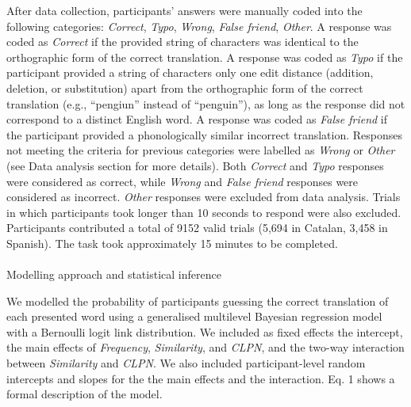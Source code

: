 \documentclass[
]{article}
\makeatletter
\let\oldparagraph\paragraph
\renewcommand{\paragraph}{
    \@ifstar
      \xxxParagraphStar
      \xxxParagraphNoStar
  }
\newcommand{\xxxParagraphStar}[1]{\oldparagraph*{#1}\mbox{}}
\newcommand{\xxxParagraphNoStar}[1]{\oldparagraph{#1}\mbox{}}
\makeatother
\begin{document}
After data collection, participants' answers were manually coded into
the following categories: \emph{Correct}, \emph{Typo}, \emph{Wrong},
\emph{False friend}, \emph{Other}. A response was coded as
\emph{Correct} if the provided string of characters was identical to the
orthographic form of the correct translation. A response was coded as
\emph{Typo} if the participant provided a string of characters only one
edit distance (addition, deletion, or substitution) apart from the
orthographic form of the correct translation (e.g., ``pengiun'' instead
of ``penguin''), as long as the response did not correspond to a
distinct English word. A response was coded as \emph{False friend} if
the participant provided a phonologically similar incorrect translation.
Responses not meeting the criteria for previous categories were labelled
as \emph{Wrong} or \emph{Other} (see Data analysis section for more
details). Both \emph{Correct} and \emph{Typo} responses were considered
as correct, while \emph{Wrong} and \emph{False friend} responses were
considered as incorrect. \emph{Other} responses were excluded from data
analysis. Trials in which participants took longer than 10 seconds to
respond were also excluded. Participants contributed a total of 9152
valid trials (5,694 in Catalan, 3,458 in Spanish). The task took
approximately 15 minutes to be completed.

\paragraph{Modelling approach and statistical
inference}\label{modelling-approach-and-statistical-inference}

We modelled the probability of participants guessing the correct
translation of each presented word using a generalised multilevel
Bayesian regression model with a Bernoulli logit link distribution. We
included as fixed effects the intercept, the main effects of
\emph{Frequency}, \emph{Similarity}, and \emph{CLPN}, and the two-way
interaction between \emph{Similarity} and \emph{CLPN}. We also included
participant-level random intercepts and slopes for the the main effects
and the interaction. Eq. 1 shows a formal description of the model.
\end{document}

